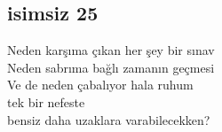 \subsection{isimsiz 25}

Neden karşıma çıkan her şey bir sınav \\
Neden sabrıma bağlı zamanın geçmesi \\
Ve de neden çabalıyor hala ruhum \\
tek bir nefeste \\
bensiz daha uzaklara varabilecekken?